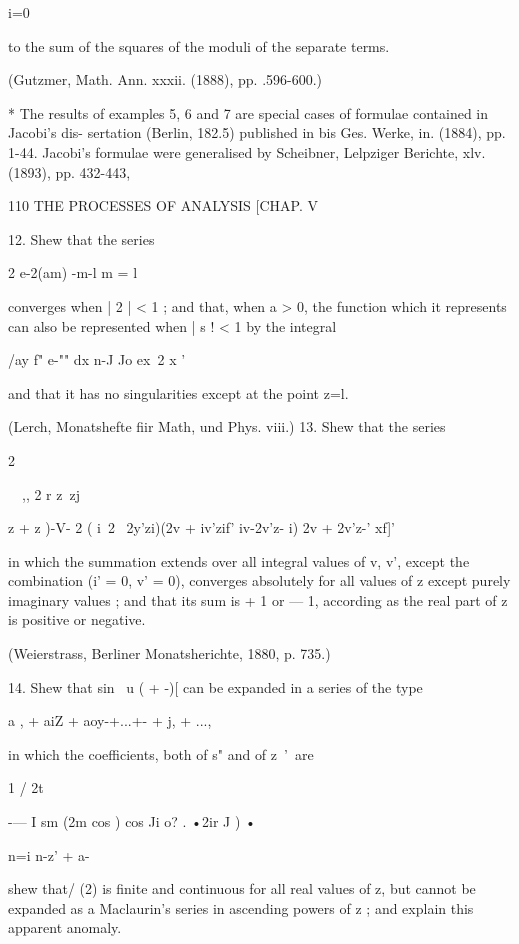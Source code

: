 {{{{ i=0

to the sum of the squares of the moduli of the separate terms.

(Gutzmer, Math. Ann. xxxii. (1888), pp. .596-600.)

* The results of examples 5, 6 and 7 are special cases of formulae
contained in Jacobi's dis- sertation (Berlin, 182.5) published in bis
Ges. Werke, in. (1884), pp. 1-44. Jacobi's formulae were generalised
by Scheibner, Lelpziger Berichte, xlv. (1893), pp. 432-443,



110 THE PROCESSES OF ANALYSIS [CHAP. V

12. Shew that the series

2 e-2(am) -m-l m = l

converges when | 2 | < 1 ; and that, when a > 0, the function which it
represents can also be represented when | s ! < 1 by the integral



/ay f" e-"" dx n-J Jo ex\ 2 x '



and that it has no singularities except at the point z=l.

(Lerch, Monatshefte fiir Math, und Phys. viii.) 13. Shew that the
series



2



\ \ ,, 2 r z\ zj \

 z + z )-V- 2 ( i\ 2 \ 2y'zi)(2v + iv'zif' iv-2v'z- i) 2v + 2v'z-'
xf]'



in which the summation extends over all integral values of v, v',
except the combination (i' = 0, v' = 0), converges absolutely for all
values of z except purely imaginary values ; and that its sum is + 1
or — 1, according as the real part of z is positive or negative.

(Weierstrass, Berliner Monatsherichte, 1880, p. 735.)

14. Shew that sin \ u ( + -)[ can be expanded in a series of the type

a , + aiZ + aoy-+...+- + j, + ...,

in which the coefficients, both of s" and of z~'\ are

1 / 2t

-— I sm (2m cos ) cos Ji o? . •2ir J ) •

n=i n-z' + a-

shew that/ (2) is finite and continuous for all real values of z, but
cannot be expanded as a Maclaurin's series in ascending powers of z ;
and explain this apparent anomaly.

}}}}
